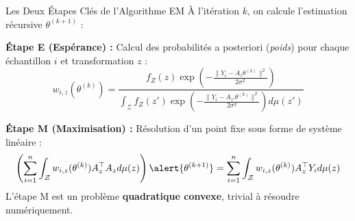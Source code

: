 \begin{frame}{Les Deux Étapes Clés de l'Algorithme EM}
    À l'itération $k$, on calcule l'estimation récursive $\theta^{(k+1)}$ :

    \textbf{Étape E (Espérance) :} Calcul des probabilités a posteriori (\textit{poids}) pour chaque échantillon $i$ et transformation $z$ :
    $$w_{i,z}(\theta^{(k)}) = \frac{f_Z(z) \exp\left(-\frac{\|Y_i - A_z\theta^{(k)}\|^2}{2\sigma^2}\right)}{\int_{\mathcal{Z}} f_Z(z') \exp\left(-\frac{\|Y_i - A_{z'}\theta^{(k)}\|^2}{2\sigma^2}\right) d\mu(z')}$$

    \textbf{Étape M (Maximisation) :} Résolution d'un point fixe sous forme de système linéaire :
    $$\left( \sum_{i=1}^n \int_{\mathcal{Z}} w_{i,z}(\theta^{(k)}) A_z^\top A_z d\mu(z) \right) \alert{\theta^{(k+1)}} = \sum_{i=1}^n \int_{\mathcal{Z}} w_{i,z}(\theta^{(k)}) A_z^\top Y_i d\mu(z)$$
    L'étape M est un problème \textbf{quadratique convexe}, trivial à résoudre numériquement.
\end{frame}